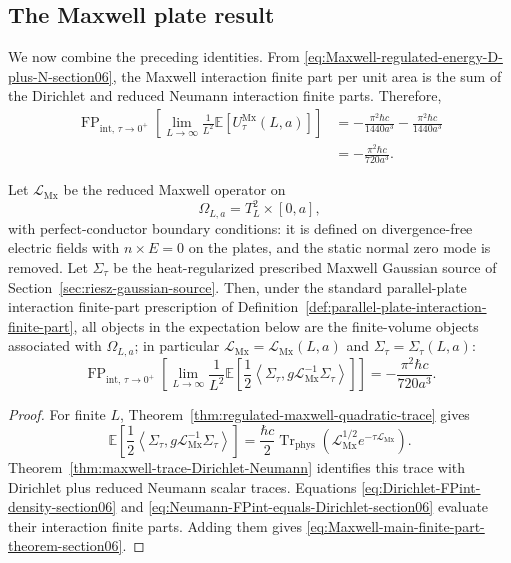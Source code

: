 \documentclass[11pt]{article}
\providecommand{\hbarc}{\hbar c}
\providecommand{\E}{\mathbb{E}}
\providecommand{\Trphys}{\operatorname{Tr}_{\mathrm{phys}}}
\providecommand{\FP}{\operatorname{FP}}
\providecommand{\inner}[2]{\left\langle #1,#2\right\rangle}
\providecommand{\paren}[1]{\left(#1\right)}
\providecommand{\OmegaLa}{\Omega_{L,a}}
\providecommand{\TtwoL}{T_L^2}
\providecommand{\LMx}{\mathcal L_{\mathrm{Mx}}}
\providecommand{\Sigmatau}{\Sigma_{\tau}}
\providecommand{\UtauMx}{U_{\tau}^{\mathrm{Mx}}}
\numberwithin{equation}{section}
\begin{document}
\subsection{The Maxwell plate result}
\label{subsec:maxwell-plate-result-section06}

We now combine the preceding identities.  From
\eqref{eq:Maxwell-regulated-energy-D-plus-N-section06}, the Maxwell interaction
finite part per unit area is the sum of the Dirichlet and reduced Neumann
interaction finite parts.  Therefore,
\begin{align}
\label{eq:Maxwell-FPint-final-calculation-section06}
    \FP_{\mathrm{int},\,\tau\to0^+}
    \left[\lim_{L\to\infty}\frac{1}{L^2}\E[\UtauMx(L,a)]\right]
    &=
    -\frac{\pi^2\hbarc}{1440a^3}
    -\frac{\pi^2\hbarc}{1440a^3} \\
    &=
    -\frac{\pi^2\hbarc}{720a^3} .
\end{align}

\begin{theorem}
\label{thm:Maxwell-parallel-plate-finite-part}
Let \(\LMx\) be the reduced Maxwell operator on
\[
    \OmegaLa=\TtwoL\times[0,a],
\]
with perfect-conductor boundary conditions: it is defined on divergence-free
electric fields with \(n\times E=0\) on the plates, and the static normal zero
mode is removed.  Let \(\Sigmatau\) be the
heat-regularized prescribed Maxwell Gaussian source of
Section~\ref{sec:riesz-gaussian-source}.  Then, under the standard
parallel-plate interaction finite-part prescription of
Definition~\ref{def:parallel-plate-interaction-finite-part},
all objects in the expectation below are the finite-volume objects associated
with \(\Omega_{L,a}\); in particular \(\LMx=\LMx(L,a)\) and
\(\Sigmatau=\Sigmatau(L,a)\):
\begin{equation}
\label{eq:Maxwell-main-finite-part-theorem-section06}
    \boxed{
    \FP_{\mathrm{int},\,\tau\to0^+}
    \left[\lim_{L\to\infty}\frac{1}{L^2}
    \E\left[
        \frac12\inner{\Sigmatau}{g\LMx^{-1}\Sigmatau}
    \right]
    \right]
    =
    -\frac{\pi^2\hbarc}{720a^3}.
    }
\end{equation}
\end{theorem}

\begin{proof}
For finite \(L\), Theorem~\ref{thm:regulated-maxwell-quadratic-trace} gives
\begin{equation*}
    \E\left[
        \frac12\inner{\Sigmatau}{g\LMx^{-1}\Sigmatau}
    \right]
    =
    \frac{\hbarc}{2}\Trphys\paren{\LMx^{1/2}e^{-\tau\LMx}} .
\end{equation*}
Theorem~\ref{thm:maxwell-trace-Dirichlet-Neumann} identifies this trace with
Dirichlet plus reduced Neumann scalar traces.  Equations
\eqref{eq:Dirichlet-FPint-density-section06} and
\eqref{eq:Neumann-FPint-equals-Dirichlet-section06} evaluate their interaction
finite parts.  Adding them gives \eqref{eq:Maxwell-main-finite-part-theorem-section06}.
\end{proof}
\end{document}
